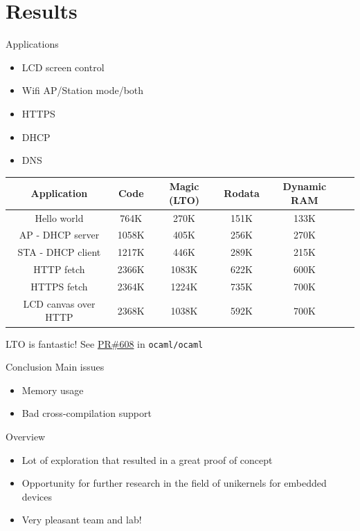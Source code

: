 \documentclass[10pt]{beamer}
\begin{document}
\section{Results}
\begin{frame}{Applications}
\begin{itemize}
\item LCD screen control
\item Wifi AP/Station mode/both
\item HTTPS 
\item DHCP
\item DNS
\end{itemize}
\pause
\begin{tabular}{|c||c|c|c|c|c|}
    \hline
    Application & Code & Magic (LTO) & Rodata & Dynamic RAM \\
    \hline
    \hline
    Hello world & 764K & 270K & 151K & 133K \\
    \hline
    AP - DHCP server & 1058K & 405K & 256K & 270K\\
    \hline
    STA - DHCP client & 1217K & 446K & 289K & 215K \\
	\hline
    HTTP fetch & 2366K & 1083K & 622K & 600K \\
    \hline
    HTTPS fetch & 2364K & 1224K & 735K & 700K\\
    \hline
    LCD canvas over HTTP & 2368K & 1038K & 592K & 700K\\
    \hline
\end{tabular}
\pause 
\vfill
LTO is fantastic! See \href{https://github.com/ocaml/ocaml/pull/608}{PR\#608} in \texttt{ocaml/ocaml}
\end{frame}
\begin{frame}{Conclusion}
Main issues
\begin{itemize}
\item<1-4> Memory usage
\item<3-4> Bad cross-compilation support
\end{itemize}
\pause[4]
Overview
\begin{itemize}
\item Lot of exploration that resulted in a great proof of concept
\item Opportunity for further research in the field of unikernels for embedded devices
\item Very pleasant team and lab!
\end{itemize}
\end{frame}
\end{document}

